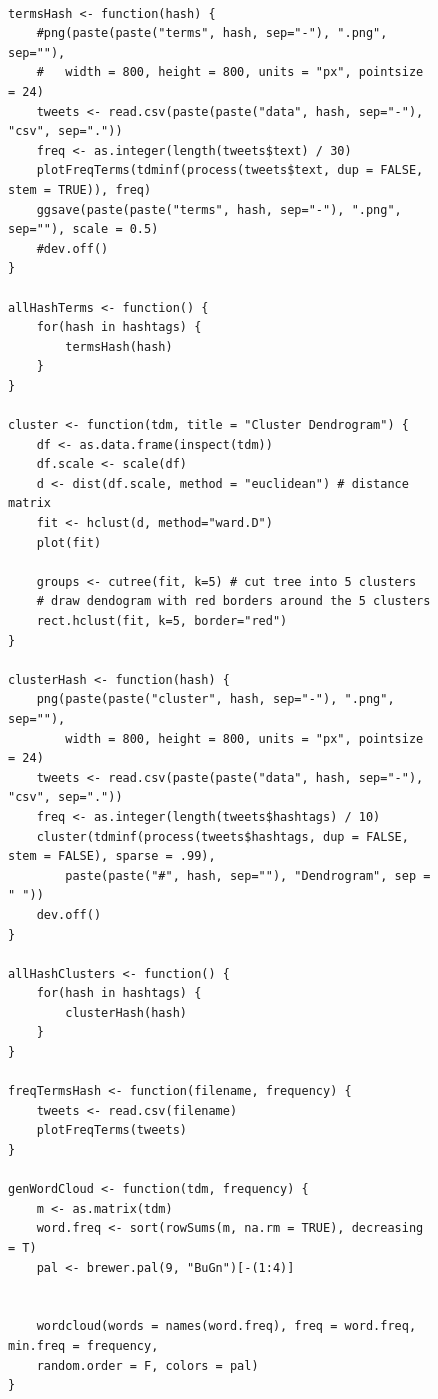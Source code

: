 \documentclass[prodmode]{acmsmall} %
\begin{document}
\begin{figure}[!t]
    \begin{lstlisting}

termsHash <- function(hash) {
	#png(paste(paste("terms", hash, sep="-"), ".png", sep=""), 
	#	width = 800, height = 800, units = "px", pointsize = 24)
	tweets <- read.csv(paste(paste("data", hash, sep="-"), "csv", sep="."))
	freq <- as.integer(length(tweets$text) / 30)
	plotFreqTerms(tdminf(process(tweets$text, dup = FALSE, stem = TRUE)), freq)
	ggsave(paste(paste("terms", hash, sep="-"), ".png", sep=""), scale = 0.5)
	#dev.off()
}

allHashTerms <- function() {
	for(hash in hashtags) {
		termsHash(hash)
	}
}

cluster <- function(tdm, title = "Cluster Dendrogram") {
	df <- as.data.frame(inspect(tdm))
	df.scale <- scale(df)
	d <- dist(df.scale, method = "euclidean") # distance matrix
	fit <- hclust(d, method="ward.D")
	plot(fit)
	
	groups <- cutree(fit, k=5) # cut tree into 5 clusters
	# draw dendogram with red borders around the 5 clusters
	rect.hclust(fit, k=5, border="red")
}

clusterHash <- function(hash) {
	png(paste(paste("cluster", hash, sep="-"), ".png", sep=""), 
		width = 800, height = 800, units = "px", pointsize = 24)
	tweets <- read.csv(paste(paste("data", hash, sep="-"), "csv", sep="."))
	freq <- as.integer(length(tweets$hashtags) / 10)
	cluster(tdminf(process(tweets$hashtags, dup = FALSE, stem = FALSE), sparse = .99),
		paste(paste("#", hash, sep=""), "Dendrogram", sep = " "))
	dev.off()
}

allHashClusters <- function() {
	for(hash in hashtags) {
		clusterHash(hash)
	}
}

freqTermsHash <- function(filename, frequency) {
	tweets <- read.csv(filename)
	plotFreqTerms(tweets)
}

genWordCloud <- function(tdm, frequency) {
    m <- as.matrix(tdm)
    word.freq <- sort(rowSums(m, na.rm = TRUE), decreasing = T)
    pal <- brewer.pal(9, "BuGn")[-(1:4)]


    wordcloud(words = names(word.freq), freq = word.freq, min.freq = frequency,
    random.order = F, colors = pal)
}


\end{lstlisting}
  \end{figure}
\end{document}
